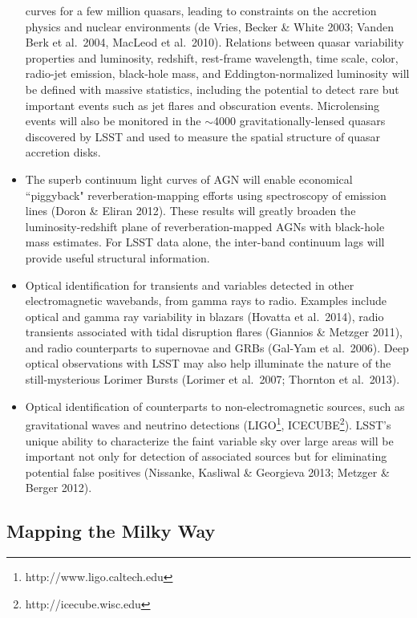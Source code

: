 \documentclass{emulateapj}
\begin{document}
\begin{itemize}
  curves for a few million  
quasars, leading to constraints on the accretion physics and nuclear environments (de Vries, Becker 
\& White 2003; Vanden Berk et al.~2004, MacLeod et al.~2010). Relations between quasar variability 
      properties and luminosity, redshift, 
      rest-frame wavelength, time scale, color, radio-jet emission, black-hole 
      mass, and Eddington-normalized luminosity will be defined with massive
      statistics, including the potential to detect rare but important events such as 
      jet flares and obscuration events. Microlensing events will also be monitored in the $\sim$4000 gravitationally-lensed 
      quasars discovered by LSST and used to measure the spatial structure of quasar accretion disks.
\item The superb continuum light curves of AGN will enable economical ``piggyback" 
      reverberation-mapping efforts using spectroscopy of emission lines (Doron \& Eliran 2012). These results 
      will greatly broaden the luminosity-redshift plane of reverberation-mapped AGNs
      with black-hole mass estimates. For LSST data alone, the inter-band continuum lags 
      will provide useful structural information. 
\item Optical identification for transients and variables detected in other electromagnetic wavebands, 
from gamma rays to radio. Examples include optical and gamma ray variability in blazars (Hovatta et al.~2014), 
radio transients associated with tidal disruption flares (Giannios \& Metzger 2011), and radio counterparts to 
supernovae and GRBs (Gal-Yam et al.~2006). Deep optical observations with LSST may also help illuminate the 
nature of the still-mysterious Lorimer Bursts (Lorimer et al.~2007; Thornton et al.~2013).
\item Optical identification of counterparts to non-electromagnetic sources, such as gravitational waves and
neutrino detections (LIGO\footnote{http://www.ligo.caltech.edu}, ICECUBE\footnote{http://icecube.wisc.edu}). 
LSST's unique ability to characterize the faint variable sky over large areas will be important not only for detection 
of associated sources but for eliminating potential false positives (Nissanke, Kasliwal \& Georgieva 2013; 
Metzger \& Berger 2012).  
\end{itemize}



\subsection{Mapping the Milky Way }
\end{document}
